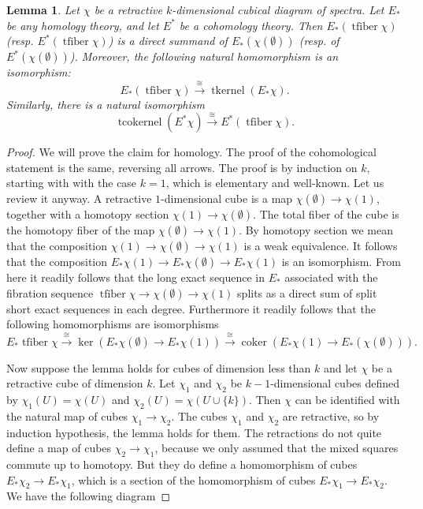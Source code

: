 \documentclass[12pt]{amsart}
\newcommand{\tfiber}{\operatorname{tfiber}}
\newcommand{\tkernel}{\operatorname{tkernel}}
\newcommand{\tcokernel}{\operatorname{tcokernel}}
\newcommand{\coker}{\operatorname{coker}}
\theoremstyle{plain}
\newtheorem{lemma}[thm]{Lemma}
\theoremstyle{definition}
\theoremstyle{remark}
\begin{document}
\begin{lemma}\label{L:commute}
Let $\chi$ be a retractive $k$-dimensional cubical diagram of spectra. Let $E_*$ be any homology theory, and let $E^*$ be a cohomology theory. Then $E_*(\tfiber\chi)$ (resp. $E^*(\tfiber \chi)$) is a direct summand of $E_*(\chi(\emptyset))$ (resp. of $E^*(\chi(\emptyset))$). Moreover, the following natural homomorphism is an isomorphism:
\[
E_*(\tfiber\chi)\xrightarrow{\cong} \tkernel\left(E_*\chi\right).
\]
Similarly, there is a natural isomorphism
\[
\tcokernel(E^*\chi)\xrightarrow{\cong} E^*(\tfiber\chi).
\]
\end{lemma}
\begin{proof}
We will prove the claim for homology. The proof of the cohomological statement is the same, reversing all arrows. The proof is by induction on $k$, starting with with the case $k=1$, which is elementary and well-known. Let us review it anyway. A retractive $1$-dimensional cube is a map $\chi(\emptyset) \to \chi(1)$, together with a homotopy section $\chi(1)\to \chi(\emptyset)$. The total fiber of the cube is the homotopy fiber of the map $\chi(\emptyset) \to \chi(1)$. By homotopy section we mean that the composition $\chi(1) \to \chi(\emptyset)\to \chi(1)$ is a weak equivalence. It follows that the composition $E_*\chi(1) \to E_*\chi(\emptyset)\to E_*\chi(1)$ is an isomorphism. From here it readily follows that the long exact sequence in $E_*$ associated with the fibration sequence $\tfiber\chi\to \chi(\emptyset)\to \chi(1)$ splits as a direct sum of split short exact sequences in each degree. Furthermore it readily follows that the following homomorphisms are isomorphisms
\[
E_*\tfiber\chi\xrightarrow{\cong} \ker\left(E_*\chi(\emptyset)\to E_*\chi(1)\right) \xrightarrow{\cong} \coker\left(E_*\chi(1)\to E_*(\chi(\emptyset))\right).
\]

Now suppose the lemma holds for cubes of dimension less than $k$ and let $\chi$ be a retractive cube of dimension $k$. Let $\chi_1$ and $\chi_2$ be $k-1$-dimensional cubes defined by $\chi_1(U)=\chi(U)$ and $\chi_2(U)=\chi(U\cup \{k\})$. Then $\chi$ can be identified with the natural map of cubes $\chi_1\to \chi_2$. The cubes $\chi_1$ and $\chi_2$ are retractive, so by induction hypothesis, the lemma holds for them. The retractions do not quite define a map of cubes $\chi_2\to \chi_1$, because we only assumed that the mixed squares commute up to homotopy. But they do define a homomorphism of cubes $E_*\chi_2\to E_*\chi_1$, which is a section of the homomorphism of cubes $E_*\chi_1\to E_*\chi_2$. We have the following diagram




\end{proof}
\end{document}
